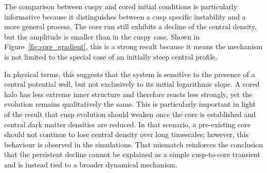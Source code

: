 The comparison between cuspy and cored initial conditions is particularly informative because it distinguishes between a cusp specific instability and a more general process. The core run still exhibits a decline of the central density, but the amplitude is smaller than in the cuspy case. Shown in Figure~\ref{fig:core_gradient}, this is a strong result because it means the mechanism is not limited to the special case of an initially steep central profile.




In physical terms, this suggests that the system is sensitive to the presence of a central potential well, but not exclusively to its initial logarithmic slope. A cored halo has less extreme inner structure and therefore reacts less strongly, yet the evolution remains qualitatively the same. This is particularly important in light of the \cite{errani2026collisional} result that cusp evolution should weaken once the core is established and central dark matter densities are reduced. In that scenario, a pre-existing core should not continue to lose central density over long timescales; however, this behaviour is observed in the simulations. That mismatch reinforces the conclusion that the persistent decline cannot be explained as a simple cusp-to-core transient and is instead tied to a broader dynamical mechanism.

